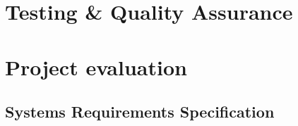 \documentclass[12pt]{report}
\newcommand\blankpage{%
    \null
    \thispagestyle{empty}%
    \addtocounter{page}{-1}%
    \newpage}
\begin{document}
\chapter{Testing \& Quality Assurance}


\chapter{Project evaluation}


\afterpage{\blankpage}

\begin{appendices}

\chapter{Systems Requirements Specification}
% 

\end{appendices}

\printbibliography

\afterpage{\blankpage}
\end{document}
